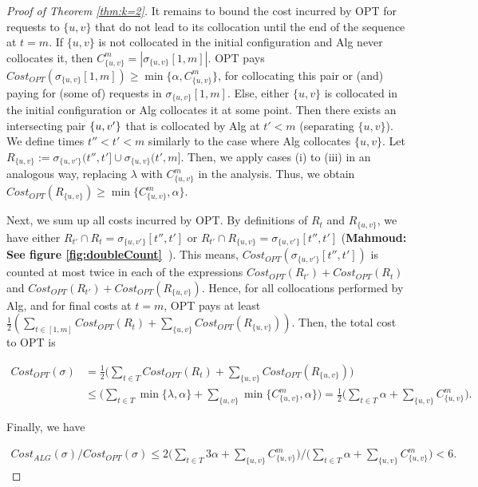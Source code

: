 \documentclass[manuscript,screen=true, review, anonymous]{acmart}
\DeclarePairedDelimiter\set{\{}{\}}
\newcommand\mahmoud[1]{\color{orange}\textbf{Mahmoud: #1~}\color{black}}
\begin{document}
\begin{proof}[Proof of Theorem \ref{thm:k=2}]
	It remains to bound the cost  incurred by OPT for requests to $\{u,v\}$ that do not lead to its collocation until the end of the sequence at $t=m$.
	If $\{u,v\}$ is not collocated in the initial configuration
	and Alg never collocates it,
	then $ C^{m}_{ \{u,v\} } =| \sigma_{\{u,v\}}[1,m] |$.
	OPT pays
	$\mathit{Cost}_{\mathit{OPT}} (\sigma_{\{u,v\}}[1,m]) 
	\geq \min{ \{ \alpha, C^{m}_{ \{u,v\} } \} }$,
	for collocating this pair or (and) paying for (some of) requests in $\sigma_{\{u,v\}}[1,m]$.
	Else,
	either $\{u,v\}$ is collocated in the initial configuration
	or Alg collocates it at some point.
	Then there exists an intersecting pair $\set{u,v'}$
	that is collocated by Alg at $t' < m$ (separating $\{u,v\}$).
	We define times $t'' < t' < m$ similarly to the case where Alg collocates $\{u,v\}$.
	Let $R_{\{u,v\}} := \sigma_{\{u,v'\}} (t'',t'] \cup \sigma_{\{u,v\}} (t',m]$.
	Then,
	we apply cases (i) to (iii) in an analogous way,
	replacing $\lambda$ with $C^{m}_{ \{u,v\}}$ in the analysis.
	Thus, 
	we obtain
	$\mathit{Cost}_{\mathit{OPT}} (R_{\{u,v\}}) 
	\geq  \min{ \{ C^{m}_{ \{u,v\}}, \alpha \}}$.
	
	Next, we sum up all costs incurred by OPT.
	By definitions of $R_t$ and $R_{\{u,v\}}$, we have either
	$R_{t'} \cap R_t = \sigma_{\{u,v'\}}[t'',t']$ or
	$R_{t'} \cap R_{\{u,v\}} = \sigma_{\{u,v'\}}[t'',t']$
	(\mahmoud{See figure \ref{fig:doubleCount}}). 
	This means,
	$\mathit{Cost}_{OPT} ( \sigma_{\{u,v'\}}[t'',t'])$
	is counted at most twice in each of  the expressions
	$\mathit{Cost}_{\mathit{OPT}} (R_{t'}) + \mathit{Cost}_{\mathit{OPT}} (R_t)$
	and  
	$\mathit{Cost}_{\mathit{OPT}} (R_{t'}) + \mathit{Cost}_{\mathit{OPT}} (R_{\{u,v\}})$.
	Hence,
	for all collocations performed by Alg,
	and for final costs at $t=m$,
	OPT pays at least 
	$\frac{1}{2}(
	\sum_{ t \in [1,m] } \mathit{Cost}_{\mathit{OPT}} (R_t) +
	\sum_{\{u,v\}} \mathit{Cost}_{\mathit{OPT}} (R_{\{u,v\}})
	) $.
	Then,
	the total cost to OPT is
	
	\begin{align*} 	%
		\mathit{Cost}_{\mathit{OPT}} (\sigma)
		&=
		\frac{1}{2}
		\Big(
		\sum_{ t \in T} \mathit{Cost}_{\mathit{OPT}} (R_t) 
		+ \sum_{\{u,v\}}\mathit{Cost}_{\mathit{OPT}} (R_{\{u,v\}})
		\Big)	\\
		&\leq
		\Big(
		\sum_{ t \in T} \min{ \{ \lambda, \alpha \}}  +
		\sum_{\{u,v\}} \min{ \{C^{m}_{\{u,v\}} , \alpha \} } 
		\Big)		
		=
		\frac{1}{2}		
		\Big(
		\sum_{ t \in T} \alpha  
		+ \sum_{\{u,v\}} C^{m}_{\{u,v\}}
		\Big).
	\end{align*}

Finally, we have

\begin{align*}
	\mathit{Cost}_{\mathit{ALG}} (\sigma)	/
	\mathit{Cost}_{\mathit{OPT}} (\sigma)
	\leq
	2\Big(
	\sum_{ t \in T} 3\alpha +
	\sum_{\{u,v\}} C^{m}_{\{u,v\}}
	\Big)	 \big /
	\Big(
	\sum_{ t \in T} \alpha  
	+ \sum_{\{u,v\}} C^{m}_{\{u,v\}}  
	\Big)	< 6.
\end{align*}

\end{proof}
\end{document}
